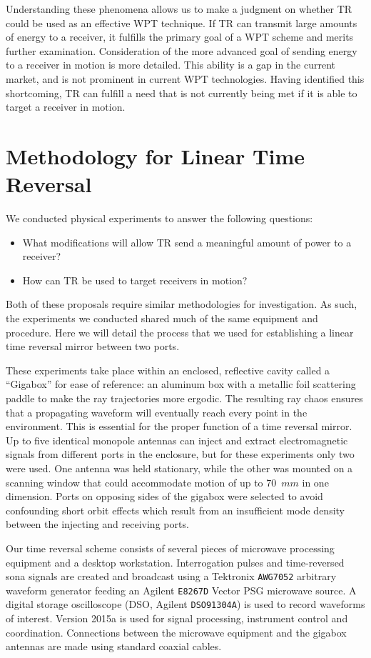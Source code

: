 Understanding these phenomena allows us to make a judgment on whether TR could be used as an effective WPT technique. If TR can transmit large amounts of energy to a receiver, it fulfills the primary goal of a WPT scheme and merits further examination. Consideration of the more advanced goal of sending energy to a receiver in motion is more detailed. This ability is a gap in the current market, and is not prominent in current WPT technologies. Having identified this shortcoming, TR can fulfill a need that is not currently being met if it is able to target a receiver in motion.

\section{Methodology for Linear Time Reversal}
\label{sec:ltr-meth}

We conducted physical experiments to answer the following questions:
\begin{itemize}
    \item What modifications will allow TR send a meaningful amount of power to a receiver?
    \item How can TR be used to target receivers in motion?
\end{itemize}
Both of these proposals require similar methodologies for investigation. As such, the experiments we conducted shared much of the same equipment and procedure. Here we will detail the process that we used for establishing a linear time reversal mirror between two ports.

These experiments take place within an enclosed, reflective cavity called a ``Gigabox'' for ease of reference: an aluminum box with a metallic foil scattering paddle to make the ray trajectories more ergodic. The resulting ray chaos ensures that a propagating waveform will eventually reach every point in the environment. This is essential for the proper function of a time reversal mirror. Up to five identical monopole antennas can inject and extract electromagnetic signals from different ports in the enclosure, but for these experiments only two were used. One antenna was held stationary, while the other was mounted on a scanning window that could accommodate motion of up to 70~$mm$ in one dimension. Ports on opposing sides of the gigabox were selected to avoid confounding short orbit effects which result from an insufficient mode density between the injecting and receiving ports.

Our time reversal scheme consists of several pieces of microwave processing equipment and a desktop workstation. Interrogation pulses and time-reversed sona signals are created and broadcast using a Tektronix \texttt{AWG7052} arbitrary waveform generator feeding an Agilent \texttt{E8267D} Vector PSG microwave source. A digital storage oscilloscope (DSO, Agilent \texttt{DSO91304A}) is used to record waveforms of interest. \matlab{} Version 2015a is used for signal processing, instrument control and coordination. Connections between the microwave equipment and the gigabox antennas are made using standard coaxial cables.

